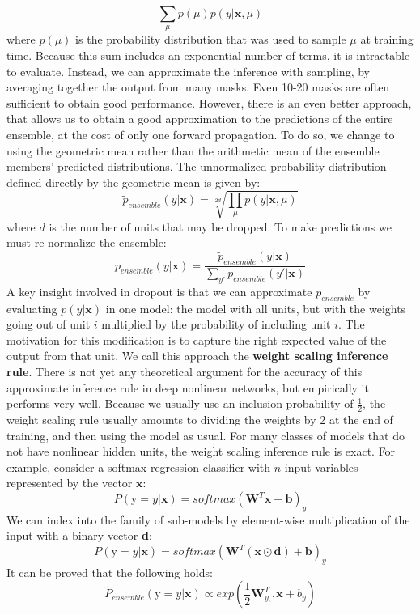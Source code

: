 \[\sum_{\mu}p(\mu)p(y | \textbf{x}, \mu)\]
where $p(\mu)$ is the probability distribution that was used to sample $\mu$ at training time.\newline\newline
Because this sum includes an exponential number of terms, it is intractable to evaluate. Instead, we can approximate the inference with sampling, by averaging together the output from many masks. Even 10-20 masks are often sufficient to obtain good performance.\newline\newline
However, there is an even better approach, that allows us to obtain a good
approximation to the predictions of the entire ensemble, at the cost of only one forward propagation. To do so, we change to using the geometric mean rather than the arithmetic mean of the ensemble members’ predicted distributions. The unnormalized probability distribution defined directly by the geometric mean is given by:
\[\tilde{p}_{ensemble}(y | \textbf{x}) = \sqrt[2d]{\prod_{\mu} p(y | \textbf{x}, \mu)}\]
where $d$ is the number of units that may be dropped. To make predictions we must re-normalize the ensemble:
\[p_{ensemble}(y | \textbf{x}) = \frac{\tilde{p}_{ensemble}(y | \textbf{x})}{\sum_{y'}p_{ensemble}(y' | \textbf{x})}\]
A key insight involved in dropout is that we can approximate $p_{ensemble}$ by evaluating $p(y | \textbf{x})$ in one model: the model with all units, but with the weights going out of unit $i$ multiplied by the probability of including unit $i$.  The motivation for this modification is to capture the right expected value of the
output from that unit. We call this approach the \textbf{weight scaling inference rule}. There is not yet any theoretical argument for the accuracy of this approximate inference rule in deep nonlinear networks, but empirically it performs very well.\newline\newline
Because we usually use an inclusion probability of $\frac{1}{2}$, the weight scaling rule usually amounts to dividing the weights by 2 at the end of training, and then using the model as usual.\newline\newline
For many classes of models that do not have nonlinear hidden units, the weight scaling inference rule is exact. For example, consider a softmax regression classifier with $n$ input variables represented by the vector $\textbf{x}$:
\[P(\text{y} = y | \textbf{x}) = softmax(\textbf{W}^T \textbf{x} + \textbf{b})_y\]
We can index into the family of sub-models by element-wise multiplication of the input with a binary vector \textbf{d}:
\[P(\text{y} = y | \textbf{x}) = softmax(\textbf{W}^T (\textbf{x} \odot \textbf{d}) + \textbf{b})_y\]
It can be proved that the following holds:
\[\tilde{P}_{ensemble}(\text{y} = y | \textbf{x}) \propto exp(\frac{1}{2}\textbf{W}^T_{y,:}\textbf{x} + b_y)\]

